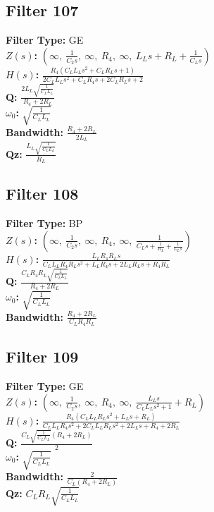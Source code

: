 \documentclass{article}
\begin{document}
\subsection*{Filter 107}
\textbf{Filter Type:} GE \\ 
\textbf{$Z(s)$:} $\left( \infty, \  \frac{1}{C_{2} s}, \  \infty, \  R_{4}, \  \infty, \  L_{L} s + R_{L} + \frac{1}{C_{L} s}\right)$ \\ 
\textbf{$H(s)$:} $\frac{R_{4} \left(C_{L} L_{L} s^{2} + C_{L} R_{L} s + 1\right)}{2 C_{L} L_{L} s^{2} + C_{L} R_{4} s + 2 C_{L} R_{L} s + 2}$ \\ 
\textbf{Q:} $\frac{2 L_{L} \sqrt{\frac{1}{C_{L} L_{L}}}}{R_{4} + 2 R_{L}}$ \\ 
\textbf{$\omega_0$:} $\sqrt{\frac{1}{C_{L} L_{L}}}$ \\ 
\textbf{Bandwidth:} $\frac{R_{4} + 2 R_{L}}{2 L_{L}}$ \\ 
\textbf{Qz:} $\frac{L_{L} \sqrt{\frac{1}{C_{L} L_{L}}}}{R_{L}}$ \\ 
\subsection*{Filter 108}
\textbf{Filter Type:} BP \\ 
\textbf{$Z(s)$:} $\left( \infty, \  \frac{1}{C_{2} s}, \  \infty, \  R_{4}, \  \infty, \  \frac{1}{C_{L} s + \frac{1}{R_{L}} + \frac{1}{L_{L} s}}\right)$ \\ 
\textbf{$H(s)$:} $\frac{L_{L} R_{4} R_{L} s}{C_{L} L_{L} R_{4} R_{L} s^{2} + L_{L} R_{4} s + 2 L_{L} R_{L} s + R_{4} R_{L}}$ \\ 
\textbf{Q:} $\frac{C_{L} R_{4} R_{L} \sqrt{\frac{1}{C_{L} L_{L}}}}{R_{4} + 2 R_{L}}$ \\ 
\textbf{$\omega_0$:} $\sqrt{\frac{1}{C_{L} L_{L}}}$ \\ 
\textbf{Bandwidth:} $\frac{R_{4} + 2 R_{L}}{C_{L} R_{4} R_{L}}$ \\ 
\subsection*{Filter 109}
\textbf{Filter Type:} GE \\ 
\textbf{$Z(s)$:} $\left( \infty, \  \frac{1}{C_{2} s}, \  \infty, \  R_{4}, \  \infty, \  \frac{L_{L} s}{C_{L} L_{L} s^{2} + 1} + R_{L}\right)$ \\ 
\textbf{$H(s)$:} $\frac{R_{4} \left(C_{L} L_{L} R_{L} s^{2} + L_{L} s + R_{L}\right)}{C_{L} L_{L} R_{4} s^{2} + 2 C_{L} L_{L} R_{L} s^{2} + 2 L_{L} s + R_{4} + 2 R_{L}}$ \\ 
\textbf{Q:} $\frac{C_{L} \sqrt{\frac{1}{C_{L} L_{L}}} \left(R_{4} + 2 R_{L}\right)}{2}$ \\ 
\textbf{$\omega_0$:} $\sqrt{\frac{1}{C_{L} L_{L}}}$ \\ 
\textbf{Bandwidth:} $\frac{2}{C_{L} \left(R_{4} + 2 R_{L}\right)}$ \\ 
\textbf{Qz:} $C_{L} R_{L} \sqrt{\frac{1}{C_{L} L_{L}}}$ \\ 
\end{document}
